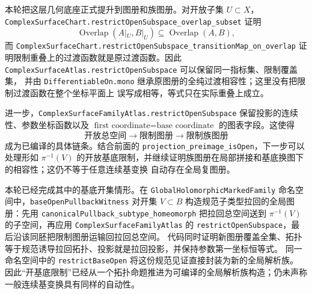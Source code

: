 \documentclass[UTF8,fontset=none,a4paper,11pt]{ctexart}
\begin{document}
本轮把这层几何底座正式提升到图册和族图册。对开放子集 \(U\subset X\)，
\texttt{ComplexSurfaceChart\allowbreak.restrictOpenSubspace\allowbreak\_overlap\allowbreak\_subset} 证明
\[
  \operatorname{Overlap}(A|_U,B|_U)\subseteq\operatorname{Overlap}(A,B),
\]
而 \texttt{ComplexSurfaceChart\allowbreak.restrictOpenSubspace\allowbreak\_transitionMap\allowbreak\_on\allowbreak\_overlap}
证明限制重叠上的过渡函数就是原过渡函数。因此
\texttt{ComplexSurfaceAtlas\allowbreak.restrictOpenSubspace} 可以保留同一指标集、限制覆盖集，
并由 \texttt{DifferentiableOn.mono} 继承原图册的全纯过渡相容性；这里没有把限制过渡函数在整个坐标平面上
误写成相等，等式只在实际重叠上成立。
\par
进一步，\texttt{ComplexSurfaceFamilyAtlas\allowbreak.restrictOpenSubspace} 保留投影的连续性、参数坐标函数以及
\(\text{first coordinate}=\text{base coordinate}\) 的图表字段。这使得
\[
  \text{开放总空间}\longrightarrow\text{限制图册}\longrightarrow\text{限制族图册}
\]
成为已编译的具体链条。结合前面的 \texttt{projection\_preimage\_isOpen}，下一步可以处理形如
\(\pi^{-1}(V)\) 的开放基底限制，并继续证明族图册在局部拼接和基底换图下的相容性；这仍不等于任意连续基变换
自动存在全局复图册。

本轮已经完成其中的基底开集情形。在
\texttt{GlobalHolomorphicMarkedFamily} 命名空间中，\texttt{baseOpenPullbackWitness}
对开集 \(V\subset B\) 构造规范子类型拉回的全局图册：先用
\texttt{canonicalPullback\_subtype\_homeomorph} 把拉回总空间送到
\(\pi^{-1}(V)\) 的子空间，再应用
\texttt{ComplexSurfaceFamilyAtlas} 的 \texttt{restrictOpenSubspace}，最后沿该同胚把限制图册运输回拉回总空间。
代码同时证明新图册覆盖全集、拓扑等于规范诱导拉回拓扑、投影就是拉回投影，并保持参数第一坐标恒等式。
同一命名空间中的 \texttt{restrictBaseOpen} 将这份规范见证直接封装为新的全局解析族。
因此“开基底限制”已经从一个拓扑命题推进为可编译的全局解析族构造；仍未声称一般连续基变换具有同样的自动性。
\end{document}
